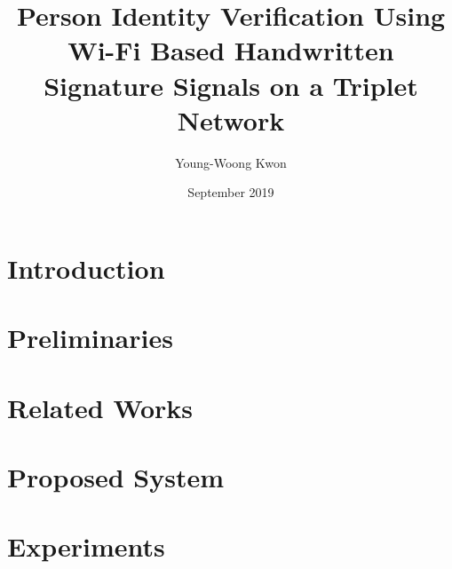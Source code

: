 \documentclass[a4paper,11pt]{report}
\title{Person Identity Verification Using Wi-Fi Based Handwritten Signature Signals on a Triplet Network}
\author{Young-Woong Kwon}
\date{September 2019}
\begin{document}
\makecover
\maketitle

\signaturepage

\pagestyle{plain}
\baselineskip 8.5mm
 \pagestyle{plain}
%
\setcounter{page}{0}
\tableofcontents
\listoffigures
{}
\listoftables
{}

\begin{abstract}

\end{abstract}

\chapter{Introduction}\label{chapter:Introduction}

%

\chapter{Preliminaries}\label{chapter:Preliminaries}


\chapter{Related Works}\label{chapter:Related Works}


%

\chapter{Proposed System}\label{chapter:Proposed Method}


\chapter{Experiments}\label{chapter:Experiments}

\end{document}
